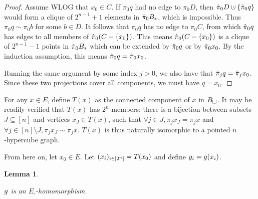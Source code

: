 \documentclass{amsart}
\newtheorem{lemma}{Lemma}[section]
\theoremstyle{definition}
\newcommand{\cupdot}{\mathbin{\mathaccent\cdot\cup}}
\begin{document}
\begin{proof}
  Assume WLOG that $x_0 \in C$. If $\pi_0 q$ had no edge to $\pi_0 D$, then
  $\pih_0 D \cupdot \{\pih_0 q\}$ would form a clique of $2^{n-1}+1$ elements
  in $\hat{\pi}_0 B_*$, which is impossible. Thus $\pi_0 q \sim \pi_0 b$ for some $b \in D$. It follows that $\pi_0 q$ has no edge to $\pi_0 C$, from which $\hat{\pi}_0 q$ has edges to all members of $\hat{\pi}_0 (C - \{x_0\})$. This means $\hat{\pi}_0 (C - \{x_0\})$ is a clique of $2^{n-1}-1$ points in $\hat{\pi}_0 B_*$ which can be extended by $\hat{\pi}_0 q$ or by $\hat{\pi}_0 x_0$. By the induction assumption, this means $\hat{\pi}_0 q = \hat{\pi}_0 x_0$.
  
  Running the same argument by some index $j > 0$, we also have that $\hat{\pi}_j q = \hat{\pi}_j x_0$. Since these two projections cover all components, we must have $q = x_0$.
\end{proof}

For any $x \in E$, define $T(x)$ as the connected component of $x$ in $B_\square$. It may be readily verified that $T(x)$ has $2^n$ members: there is a bijection between subsets $J \subseteq [n]$ and vertices $x_J \in T(x)$, such that $\forall j \in J, \pi_j x_J = \pi_j x$ and $\forall j \in [n]\setminus J, \pi_j x_J \sim \pi_j x$. $T(x)$ is thus naturally isomorphic to a pointed $n$‑hypercube graph.

From here on, let $x_0 \in E$. Let $(x_i)_{i \in [2^n]} = T(x_0)$ and define $y_i = g(x_i)$.


\begin{lemma} \label{one-component}

  $g$ is an $E_\square$-homomorphism.
  \end{lemma}
\end{document}
